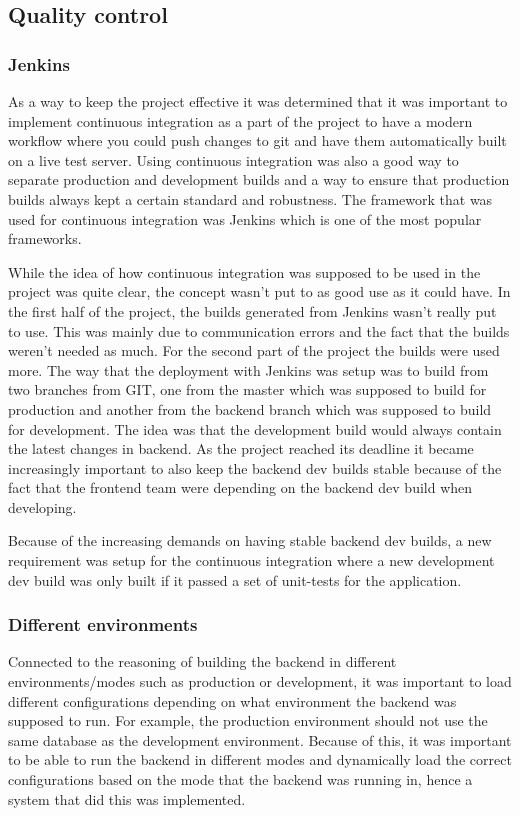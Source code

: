 \subsection{Quality control}
\subsubsection{Jenkins}
As a way to keep the project effective it was determined that it was important to implement continuous integration as a part of the project to have a modern workflow where you could push changes to git and have them automatically built on a live test server. Using continuous integration was also a good way to separate production and development builds and a way to ensure that production builds always kept a certain standard and robustness. The framework that was used for continuous integration was Jenkins which is one of the most popular frameworks.

While the idea of how continuous integration was supposed to be used in the project was quite clear, the concept wasn't put to as good use as it could have. In the first half of the project, the builds generated from Jenkins wasn't really put to use. This was mainly due to communication errors and the fact that the builds weren't needed as much. For the second part of the project the builds were used more. The way that the deployment with Jenkins was setup was to build from two branches from GIT, one from the master which was supposed to build for production and another from the backend branch which was supposed to build for development. The idea was that the development build would always contain the latest changes in backend. As the project reached its deadline it became increasingly important to also keep the backend dev builds stable because of the fact that the frontend team were depending on the backend dev build when developing.

Because of the increasing demands on having stable backend dev builds, a new requirement was setup for the continuous integration where a new development dev build was only built if it passed a set of unit-tests for the application.

\subsubsection{Different environments}
Connected to the reasoning of building the backend in different environments/modes such as production or development, it was important to load different configurations depending on what environment the backend was supposed to run. For example, the production environment should not use the same database as the development environment. Because of this, it was important to be able to run the backend in different modes and dynamically load the correct configurations based on the mode that the backend was running in, hence a system that did this was implemented.

